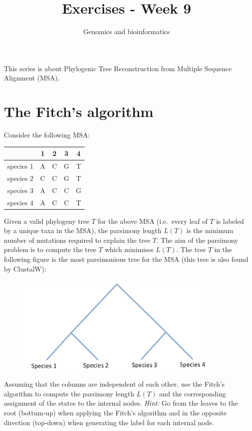 \documentclass[a4paper,11pt]{article}
\title{Exercises - Week 9}
\date{}
\author{Genomics and bioinformatics}
\begin{document}
\maketitle

\noindent This series is about Phylogenic Tree Reconstruction from Multiple Sequence Alignment (MSA).

\section{The Fitch's algorithm}

\noindent  Consider the following MSA:

\begin{table}[h!]
\begin{center}
\begin{tabular}{|c|c|c|c|c|}
\hline
 & 1 & 2 & 3 & 4\\
\hline
species 1 & A & C & G & T\\
\hline
species 2 & C & C & G & T\\
\hline
species 3 & A & C & C & G\\
\hline
species 4 & A & C & C & T\\
 \hline
\end{tabular}
\end{center}
\end{table}

\noindent Given a valid phylogeny tree $T$ for the above MSA (i.e.~every leaf of $T$ is labeled by a unique taxa in the MSA), the parsimony length $L(T)$ is the minimum number of mutations required to explain the tree $T$. The aim of the parsimony problem is to compute the tree $T$ which minimises $L(T)$. The tree $T$ in the following figure is the most parsimonious tree for the MSA (this tree is also found by ClustalW):

\begin{figure}[h!]
\centering\includegraphics[width=10cm]{Tree_T.png}
\end{figure}

\noindent Assuming that the columns are independent of each other, use the Fitch's algorithm to compute the parsimony length $L(T)$ and the corresponding assignment of the states to the internal nodes. \textit{Hint:} Go from the leaves to the root (bottum-up) when applying the Fitch's algorithm and in the opposite direction (top-down) when generating the label for each internal node.
\end{document}
